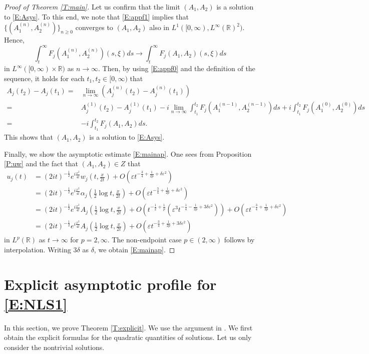 \documentclass[11pt,a4paper,oneside]{amsart}
\theoremstyle{plain}
\theoremstyle{remark}
\numberwithin{equation}{section}
\newcommand{\R}{\mathbb{R}}
\def\ge{\geqslant}
\newcommand{\eps}{\varepsilon}
\theoremstyle{definition}
\begin{document}
\begin{proof}[Proof of Theorem \ref{T:main}]
Let us confirm that the limit $(A_1,A_2)$ is a solution to \eqref{E:Asys}.
To this end, we note that \eqref{E:appf1} implies that
 $\{ (A_1^{(n)},A_2^{(n)}) \}_{n\ge0}$ converges to $(A_1,A_2) $
also in $L^1([0,\infty),  L^\infty(\R)^2)$.
Hence,
\[
	\int_t^\infty F_j(A_1^{(n)},A_2^{(n)}) (s,\xi)ds
	\to \int_t^\infty F_j(A_1,A_2) (s,\xi)ds
\]
in $L^\infty([0,\infty)\times\R)$ as $n\to\infty$.
Then, by using \eqref{E:appf0} and the definition of the sequence, it holds
for each $t_1,t_2 \in [0,\infty)$ that
\begin{align*}
	A_j(t_2)-A_j(t_1) ={}& \lim_{n\to\infty}
	( A_j^{(n)}(t_2)-A_j^{(n)}(t_1)  ) \\
	={}& A_j^{(1)}(t_2)-A_j^{(1)}(t_1) -i\lim_{n\to\infty} \int_{t_1}^{t_2}
	F_j(A^{(n-1)}_1,A^{(n-1)}_2)ds +i\int_{t_1}^{t_2}
	F_j(A^{(0)}_1,A^{(0)}_2)ds\\
	={}&-i\int_{t_1}^{t_2}
	F_j(A_1,A_2)ds.
\end{align*}
This shows that $(A_1,A_2)$ is a solution to \eqref{E:Asys}.

Finally, we show the asymptotic estimate \eqref{E:mainap}.
One sees from Proposition \ref{P:uw} and
the fact that $(A_1,A_2) \in Z$ that
\begin{align*}
	u_j(t)&= (2it)^{-\frac12} e^{i \frac{x^2}{4t}} w_j(t, \tfrac{x}{2t}) + O(\eps t^{-\frac34 + \frac1{2p} + \delta \eps^2}) \\
&=(2it)^{-\frac12} e^{i \frac{x^2}{4t}} \alpha_j(\tfrac12 \log t, \tfrac{x}{2t}) + O(\eps t^{-\frac34 + \frac1{2p}+ \delta \eps^2})\\
&=(2it)^{-\frac12} e^{i \frac{x^2}{4t}} A_j(\tfrac12 \log t, \tfrac{x}{2t}) 
+ O(t^{-\frac12+\frac1{p}} (\eps^3 t^{-\frac14-\frac1{2p}+3\delta \eps^2}))
+ O(\eps t^{-\frac34 + \frac1{2p}+ \delta \eps^2})\\
&=(2it)^{-\frac12} e^{i \frac{x^2}{4t}} A_j(\tfrac12 \log t, \tfrac{x}{2t}) 
+ O(\eps t^{-\frac34 + \frac1{2p}+ 3\delta \eps^2})
\end{align*}
in $L^p(\R)$ as $t\to\infty$ for $p=2,\infty$.
The non-endpoint case $p\in(2,\infty)$ follows by interpolation.
Writing $3\delta$ as $\delta$, we obtain \eqref{E:mainap}.
\end{proof}


\section{Explicit asymptotic profile for \eqref{E:NLS1}}\label{S:exp}

In this section, we prove Theorem \ref{T:explicit}.
We use the argument in \cite{M3}.
We first obtain the explicit formulas for the quadratic quantities of solutions.
Let us only consider the nontrivial solutions.
\end{document}

